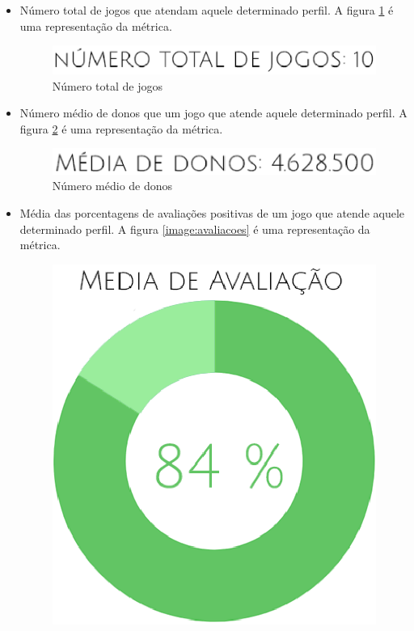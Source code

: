 \begin{itemize}
	\item Número total de jogos que atendam aquele determinado perfil. A figura \ref{image:num_total} é uma representação da métrica.
	\begin{figure}
	\centering
	\includegraphics[scale=0.5]{figuras/num_jogos.eps}
	\caption{Número total de jogos}
	\label{image:num_total}
	\end{figure}
	\item Número médio de donos que um jogo que atende aquele determinado perfil. A figura \ref{image:med_donos} é uma representação da métrica.
	\begin{figure}
	\centering
	\includegraphics[scale=0.5]{figuras/media_donos.eps}
	\caption{Número médio de donos}
	\label{image:med_donos}
	\end{figure}
	\item Média das porcentagens de avaliações positivas de um jogo que atende aquele determinado perfil. A figura \ref{image:avaliacoes} é uma representação da métrica.
	\begin{figure}
	\centering
	\includegraphics[scale=0.3]{figuras/avaliacao.eps}

\end{figure}
\end{itemize}

